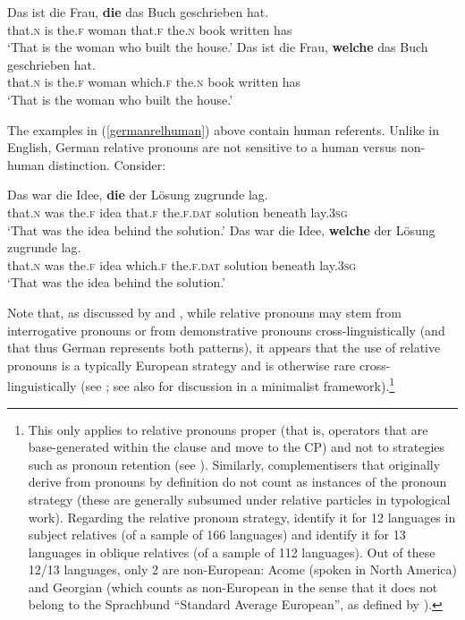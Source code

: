 \ea \label{germanrelhuman}
\ea \gll Das ist die Frau, \textbf{die} das Buch geschrieben hat.\\
that.\textsc{n} is the.\textsc{f} woman that.\textsc{f} the.\textsc{n} book written has\\
\glt `That is the woman who built the house.'
\ex \gll Das ist die Frau, \textbf{welche} das Buch geschrieben hat.\\
that.\textsc{n} is the.\textsc{f} woman which.\textsc{f} the.\textsc{n} book written has\\
\glt `That is the woman who built the house.'
\z
\z

The examples in (\ref{germanrelhuman}) above contain human referents. Unlike in English, German relative pronouns are not sensitive to a human versus non-human distinction. Consider:

\ea
\ea \gll Das war die Idee, \textbf{die} der Lösung zugrunde lag.\\
that.\textsc{n} was the.\textsc{f} idea that.\textsc{f} the.\textsc{f.dat} solution beneath lay.\textsc{3sg}\\
\glt `That was the idea behind the solution.'
\ex \gll Das war die Idee, \textbf{welche} der Lösung zugrunde lag.\\
that.\textsc{n} was the.\textsc{f} idea which.\textsc{f} the.\textsc{f.dat} solution beneath lay.\textsc{3sg}\\
\glt `That was the idea behind the solution.'
\z
\z

Note that, as discussed by \citet{vangelderen2004, vangelderen2009} and \citet{robertsroussou2003}, while relative pronouns may stem from interrogative pronouns or from demonstrative pronouns cross-linguistically (and that thus German represents both patterns), it appears that the use of relative pronouns is a typically European strategy and is otherwise rare cross-linguistically (see \citealt{comrie2002}; see also \citealt{vangelderen2009} for discussion in a minimalist framework).\footnote{This only applies to relative pronouns proper (that is, operators that are base-generated within the clause and move to the CP) and not to strategies such as pronoun retention (see \citealt{comriekuteva2013}). Similarly, complementisers that originally derive from pronouns by definition do not count as instances of the pronoun strategy (these are generally subsumed under relative particles in typological work). Regarding the relative pronoun strategy, \citet{comriekuteva2013subject} identify it for 12 languages in subject relatives (of a sample of 166 languages) and \citet{comriekuteva2013oblique} identify it for 13 languages in oblique relatives (of a sample of 112 languages). Out of these 12/13 languages, only 2 are non-European: Acome (spoken in North America) and Georgian (which counts as non-European in the sense that it does not belong to the Sprachbund ``Standard Average European'', as defined by \citealt{haspelmath2001}).}

